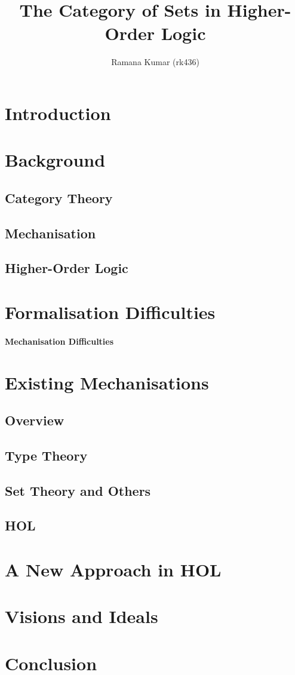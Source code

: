 \documentclass{article}
\title{The Category of Sets in Higher-Order Logic}
\author{Ramana Kumar (rk436)}
\begin{document}
\maketitle
\section{Introduction}
\section{Background}
\subsection{Category Theory}
\subsection{Mechanisation}
\subsection{Higher-Order Logic}
\section{Formalisation Difficulties}
\paragraph{Mechanisation Difficulties}
\section{Existing Mechanisations}
\subsection{Overview}
\subsection{Type Theory}
\subsection{Set Theory and Others}
\subsection{HOL}
\section{A New Approach in HOL}
\section{Visions and Ideals}
\section{Conclusion}
\end{document}
